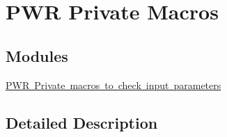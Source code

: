 \hypertarget{group___p_w_r___private___macros}{}\section{P\+WR Private Macros}
\label{group___p_w_r___private___macros}
\subsection*{Modules}
\begin{DoxyCompactItemize}
\item 
\mbox{\hyperlink{group___p_w_r___i_s___p_w_r___definitions}{P\+W\+R Private macros to check input parameters}}
\end{DoxyCompactItemize}


\subsection{Detailed Description}
